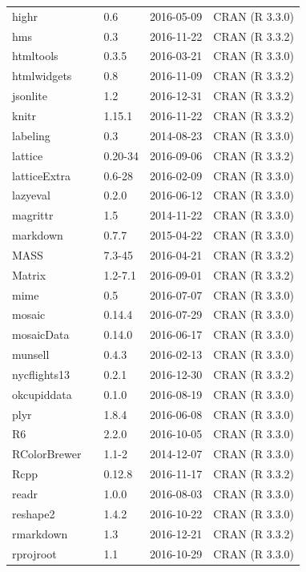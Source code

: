 \documentclass[]{tufte-book}
\begin{document}
\begin{longtable}{lllll}
highr &  & 0.6 & 2016-05-09 & CRAN (R 3.3.0)\\
\addlinespace
hms &  & 0.3 & 2016-11-22 & CRAN (R 3.3.2)\\
htmltools &  & 0.3.5 & 2016-03-21 & CRAN (R 3.3.0)\\
htmlwidgets &  & 0.8 & 2016-11-09 & CRAN (R 3.3.2)\\
jsonlite &  & 1.2 & 2016-12-31 & CRAN (R 3.3.2)\\
knitr &  & 1.15.1 & 2016-11-22 & CRAN (R 3.3.2)\\
\addlinespace
labeling &  & 0.3 & 2014-08-23 & CRAN (R 3.3.0)\\
lattice &  & 0.20-34 & 2016-09-06 & CRAN (R 3.3.2)\\
latticeExtra &  & 0.6-28 & 2016-02-09 & CRAN (R 3.3.0)\\
lazyeval &  & 0.2.0 & 2016-06-12 & CRAN (R 3.3.0)\\
magrittr &  & 1.5 & 2014-11-22 & CRAN (R 3.3.0)\\
\addlinespace
markdown &  & 0.7.7 & 2015-04-22 & CRAN (R 3.3.0)\\
MASS &  & 7.3-45 & 2016-04-21 & CRAN (R 3.3.2)\\
Matrix &  & 1.2-7.1 & 2016-09-01 & CRAN (R 3.3.2)\\
mime &  & 0.5 & 2016-07-07 & CRAN (R 3.3.0)\\
mosaic &  & 0.14.4 & 2016-07-29 & CRAN (R 3.3.0)\\
\addlinespace
mosaicData &  & 0.14.0 & 2016-06-17 & CRAN (R 3.3.0)\\
munsell &  & 0.4.3 & 2016-02-13 & CRAN (R 3.3.0)\\
nycflights13 &  & 0.2.1 & 2016-12-30 & CRAN (R 3.3.2)\\
okcupiddata &  & 0.1.0 & 2016-08-19 & CRAN (R 3.3.0)\\
plyr &  & 1.8.4 & 2016-06-08 & CRAN (R 3.3.0)\\
\addlinespace
R6 &  & 2.2.0 & 2016-10-05 & CRAN (R 3.3.0)\\
RColorBrewer &  & 1.1-2 & 2014-12-07 & CRAN (R 3.3.0)\\
Rcpp &  & 0.12.8 & 2016-11-17 & CRAN (R 3.3.2)\\
readr &  & 1.0.0 & 2016-08-03 & CRAN (R 3.3.0)\\
reshape2 &  & 1.4.2 & 2016-10-22 & CRAN (R 3.3.0)\\
\addlinespace
rmarkdown &  & 1.3 & 2016-12-21 & CRAN (R 3.3.2)\\
rprojroot &  & 1.1 & 2016-10-29 & CRAN (R 3.3.0)\\

\end{longtable}
\end{document}
